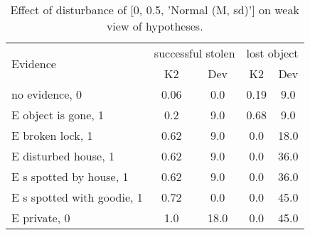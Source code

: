 \begin{table}\begin{tabular}{l|cc|cc}\toprule\multirow{2}{*}{Evidence} & \multicolumn{2}{c}{successful stolen}& \multicolumn{2}{c}{lost object}\\& {K2} & {Dev}& {K2} & {Dev}\\\midrule
no evidence, 0 & \cellcolor{Bittersweet}0.06&\cellcolor{Bittersweet}0.0&\cellcolor{Bittersweet}0.19&\cellcolor{Bittersweet}9.0\\E object is gone, 1 & \cellcolor{Bittersweet}0.2&\cellcolor{Bittersweet}9.0&\cellcolor{Bittersweet}0.68&\cellcolor{Bittersweet}9.0\\E broken lock, 1 & \cellcolor{Bittersweet}0.62&\cellcolor{Bittersweet}9.0&\cellcolor{Bittersweet}0.0&\cellcolor{Bittersweet}18.0\\E disturbed house, 1 & \cellcolor{Bittersweet}0.62&\cellcolor{Bittersweet}9.0&\cellcolor{Bittersweet}0.0&\cellcolor{Bittersweet}36.0\\E s spotted by house, 1 & \cellcolor{Bittersweet}0.62&\cellcolor{Bittersweet}9.0&\cellcolor{Bittersweet}0.0&\cellcolor{Bittersweet}36.0\\E s spotted with goodie, 1 & \cellcolor{Bittersweet}0.72&\cellcolor{Bittersweet}0.0&\cellcolor{Bittersweet}0.0&\cellcolor{Bittersweet}45.0\\E private, 0 & \cellcolor{Bittersweet}1.0&\cellcolor{Bittersweet}18.0&\cellcolor{Bittersweet}0.0&\cellcolor{Bittersweet}45.0\\\bottomrule\end{tabular}\caption{Effect of disturbance of [0, 0.5, 'Normal (M, sd)'] on weak view of hypotheses.}\end{table}